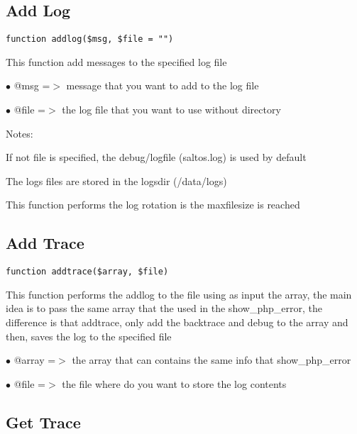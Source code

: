 \documentclass[a4paper]{book}
\begin{document}
\hypertarget{toc194}{}
\subsection{Add Log}

\begin{lstlisting}
function addlog($msg, $file = "")
\end{lstlisting}

This function add messages to the specified log file

\begin{compactitem}
\item[\color{myblue}$\bullet$] @msg  =$>$ message that you want to add to the log file
\item[\color{myblue}$\bullet$] @file =$>$ the log file that you want to use without directory
\end{compactitem}

Notes:

If not file is specified, the debug/logfile (saltos.log) is used by default

The logs files are stored in the logsdir (/data/logs)

This function performs the log rotation is the maxfilesize is reached

\hypertarget{toc195}{}
\subsection{Add Trace}

\begin{lstlisting}
function addtrace($array, $file)
\end{lstlisting}

This function performs the addlog to the file using as input the array, the
main idea is to pass the same array that the used in the show\_php\_error, the
difference is that addtrace, only add the backtrace and debug to the array
and then, saves the log to the specified file

\begin{compactitem}
\item[\color{myblue}$\bullet$] @array =$>$ the array that can contains the same info that show\_php\_error
\item[\color{myblue}$\bullet$] @file  =$>$ the file where do you want to store the log contents
\end{compactitem}

\hypertarget{toc196}{}
\subsection{Get Trace}
\end{document}
